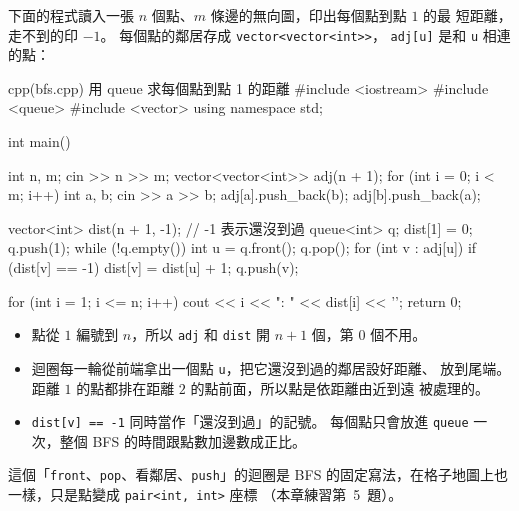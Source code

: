 下面的程式讀入一張 $n$ 個點、$m$ 條邊的無向圖，印出每個點到點 $1$ 的最
短距離，走不到的印 $-1$。 每個點的鄰居存成 \texttt{vector<vector<int>>}，
\texttt{adj[u]} 是和 \texttt{u} 相連的點：

\begin{example}[label=ex:bfs]{cpp}{(bfs.cpp) 用 queue 求每個點到點 1 的距離}
#include <iostream>
#include <queue>
#include <vector>
using namespace std;

int main() {
    int n, m;
    cin >> n >> m;
    vector<vector<int>> adj(n + 1);
    for (int i = 0; i < m; i++) {
        int a, b;
        cin >> a >> b;
        adj[a].push_back(b);
        adj[b].push_back(a);
    }

    vector<int> dist(n + 1, -1);         // -1 表示還沒到過
    queue<int> q;
    dist[1] = 0;
    q.push(1);
    while (!q.empty()) {
        int u = q.front();
        q.pop();
        for (int v : adj[u]) {
            if (dist[v] == -1) {
                dist[v] = dist[u] + 1;
                q.push(v);
            }
        }
    }

    for (int i = 1; i <= n; i++) {
        cout << i << ": " << dist[i] << '\n';
    }
    return 0;
}
\end{example}


\begin{itemize}
\item 點從 $1$ 編號到 $n$，所以 \texttt{adj} 和 \texttt{dist} 開 $n + 1$
個，第 $0$ 個不用。
\item 迴圈每一輪從前端拿出一個點 \texttt{u}，把它還沒到過的鄰居設好距離、
放到尾端。 距離 $1$ 的點都排在距離 $2$ 的點前面，所以點是依距離由近到遠
被處理的。
\item \texttt{dist[v] == -1} 同時當作「還沒到過」的記號。 每個點只會放進
\texttt{queue} 一次，整個 BFS 的時間跟點數加邊數成正比。
\end{itemize}

這個「\texttt{front}、\texttt{pop}、看鄰居、\texttt{push}」的迴圈是 BFS
的固定寫法，在格子地圖上也一樣，只是點變成 \texttt{pair<int, int>} 座標
（本章練習第~5~題）。

